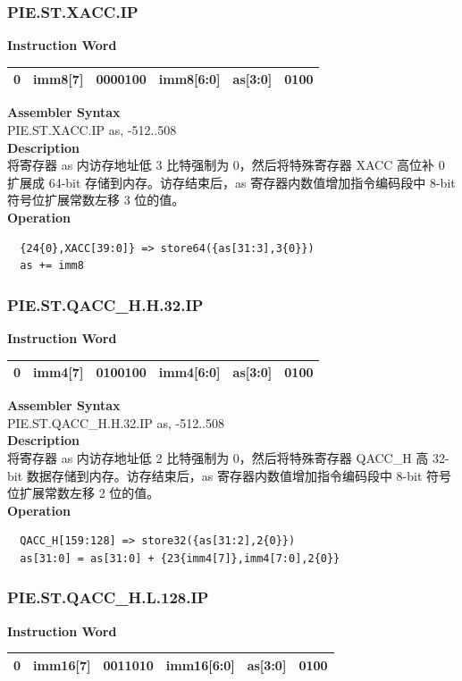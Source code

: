 \newpage
\subsubsection{PIE.ST.XACC.IP}\label{instruction:PIESTXACCIP}
\setlength\tabcolsep{6pt}
\textbf{Instruction Word} \\
\begin{tabular}{|c|c|c|c|c|c|}
	\hline
	0 & imm8[7] & 0000100 & imm8[6:0] & as[3:0] & 0100 \\
	\hline
\end{tabular}

\textbf{Assembler Syntax} \\
PIE.ST.XACC.IP as, -512..508 \\
\textbf{Description} \\
将寄存器 as 内访存地址低 3 比特强制为 0，然后将特殊寄存器 XACC 高位补 0 扩展成 64-bit 存储到内存。访存结束后，as 寄存器内数值增加指令编码段中 8-bit 符号位扩展常数左移 3 位的值。\\
\textbf{Operation}
\begin{lstlisting}
  {24{0},XACC[39:0]} => store64({as[31:3],3{0}})
  as += imm8
\end{lstlisting}

\newpage
\subsubsection{PIE.ST.QACC\_H.H.32.IP}\label{instruction:PIESTQACCHH32IP}
\setlength\tabcolsep{6pt}
\textbf{Instruction Word} \\
\begin{tabular}{|c|c|c|c|c|c|}
	\hline
	0 & imm4[7] & 0100100 & imm4[6:0] & as[3:0] & 0100 \\
	\hline
\end{tabular}

\textbf{Assembler Syntax} \\
PIE.ST.QACC\_H.H.32.IP as, -512..508 \\
\textbf{Description} \\
将寄存器 as 内访存地址低 2 比特强制为 0，然后将特殊寄存器 QACC\_H 高 32-bit 数据存储到内存。访存结束后，as 寄存器内数值增加指令编码段中 8-bit 符号位扩展常数左移 2 位的值。\\
\textbf{Operation}
\begin{lstlisting}
  QACC_H[159:128] => store32({as[31:2],2{0}})
  as[31:0] = as[31:0] + {23{imm4[7]},imm4[7:0],2{0}}
\end{lstlisting}

\newpage
\subsubsection{PIE.ST.QACC\_H.L.128.IP}\label{instruction:PIESTQACCHL128IP}
\setlength\tabcolsep{6pt}
\textbf{Instruction Word} \\
\begin{tabular}{|c|c|c|c|c|c|}
	\hline
	0 & imm16[7] & 0011010 & imm16[6:0] & as[3:0] & 0100 \\
	\hline
\end{tabular}

